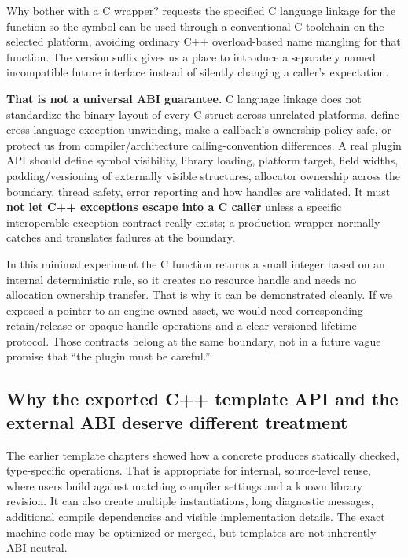 Why bother with a C wrapper?  requests the specified C language linkage for the function so the symbol can be used through a conventional C toolchain on the selected platform, avoiding ordinary C++ overload-based name mangling for that function. The version suffix  gives us a place to introduce a separately named incompatible future interface instead of silently changing a caller's expectation.

\textbf{That is not a universal ABI guarantee.} C language linkage does not standardize the binary layout of every C struct across unrelated platforms, define cross-language exception unwinding, make a callback's ownership policy safe, or protect us from compiler/architecture calling-convention differences. A real plugin API should define symbol visibility, library loading, platform target, field widths, padding/versioning of externally visible structures, allocator ownership across the boundary, thread safety, error reporting and how handles are validated. It must \textbf{not let C++ exceptions escape into a C caller} unless a specific interoperable exception contract really exists; a production wrapper normally catches and translates failures at the boundary.

In this minimal experiment the C function returns a small integer based on an internal deterministic rule, so it creates no resource handle and needs no allocation ownership transfer. That is why it can be demonstrated cleanly. If we exposed a pointer to an engine-owned asset, we would need corresponding retain/release or opaque-handle operations and a clear versioned lifetime protocol. Those contracts belong at the same boundary, not in a future vague promise that ``the plugin must be careful.''

\subsection{Why the exported C++ template API and the external ABI deserve different treatment}\label{01-foundations-i-ch006-why-the-exported-c-template-api-and-the-external-abi-deserve-different-treatment}

\hypertarget{01-foundations-i-ch006-why-the-exported-c-template-api-and-the-external-abi-deserve-different-treatment}{}

The earlier template chapters showed how a concrete  produces statically checked, type-specific operations. That is appropriate for internal, source-level reuse, where users build against matching compiler settings and a known library revision. It can also create multiple instantiations, long diagnostic messages, additional compile dependencies and visible implementation details. The exact machine code may be optimized or merged, but templates are not inherently ABI-neutral.

